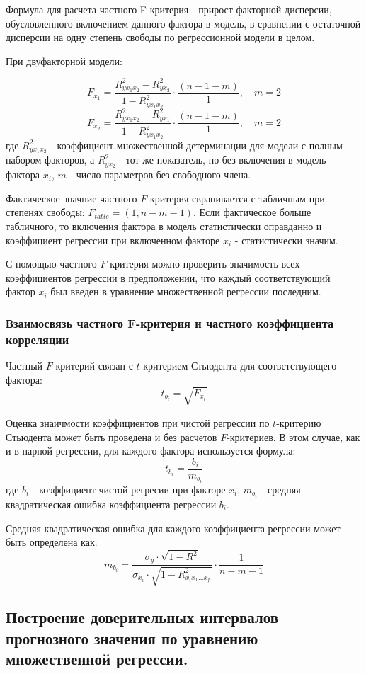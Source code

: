 \documentclass[aps,%
12pt,%
final,%
oneside,
onecolumn,%
musixtex, %
superscriptaddress,%
centertags]{article} %
\theoremstyle{plain}
\theoremstyle{definition}
\theoremstyle{remark}
\begin{document}
Формула для расчета частного F-критерия - прирост факторной дисперсии, обусловленного включением данного фактора в модель, в сравнении с остаточной дисперсии на одну степень свободы по регрессионной модели в целом.

При двуфакторной модели:

$$F_{x_1} = \frac{R_{yx_1x_2}^2 - R_{yx_2}^2}{1-R_{yx_1x_2}^2} \cdot \frac{(n-1-m)}{1}, \quad m = 2$$
$$F_{x_2} = \frac{R_{yx_1x_2}^2 - R_{yx_1}^2}{1-R_{yx_1x_2}^2} \cdot \frac{(n-1-m)}{1}, \quad m = 2$$
где $R_{yx_1x_2}^2$ - коэффициент множественной детерминации для модели с полным набором факторов, а $R_{yx_2}^2$ - тот же показатель, но без включения в модель фактора $x_i$, $m$ - число параметров без свободного члена.

Фактическое значние частного $F$ критерия свранивается с табличным при степенях свободы: $F_{table} = (1, n-m-1)$. Если фактическое больше табличного, то включения фактора в модель статистически оправданно и коэффициент регрессии при включенном факторе $x_i$ - статистически значим.

С помощью частного $F$-критерия можно проверить значимость всех коэффициентов регрессии в предположении, что каждый соответствующий фактор $x_i$ был введен в уравнение множественной регрессии последним.

\subsubsection{Взаимосвязь частного F-критерия и частного коэффициента корреляции}

Частный $F$-критерий связан с $t$-критерием Стьюдента для соответствующего фактора:
$$ t_{b_i} = \sqrt{F_{x_i}}$$

Оценка знаичмости коэффициентов при чистой регрессии по $t$-критерию Стьюдента может быть проведена и без расчетов $F$-критериев. В этом случае, как и в парной регрессии, для каждого фактора используется формула:
$$t_{b_i} = \frac{b_i}{m_{b_i}}$$
где $b_i$ - коэффициент чистой регресии при факторе $x_i$, $m_{b_i}$ - средняя квадратическая ошибка коэффициента регрессии $b_i$.

Средняя квадратическая ошибка для каждого коэффициента регрессии может быть определена как:
$$m_{b_i} = \frac{\sigma_y \cdot \sqrt{1-R^2}}{\sigma_{x_i} \cdot \sqrt{1-R^2_{x_ix_1\ldots x_p}}} \cdot \frac{1}{n-m-1}$$

\newpage

\subsection{Построение доверительных интервалов прогнозного значения по уравнению множественной регрессии.}
\end{document}

